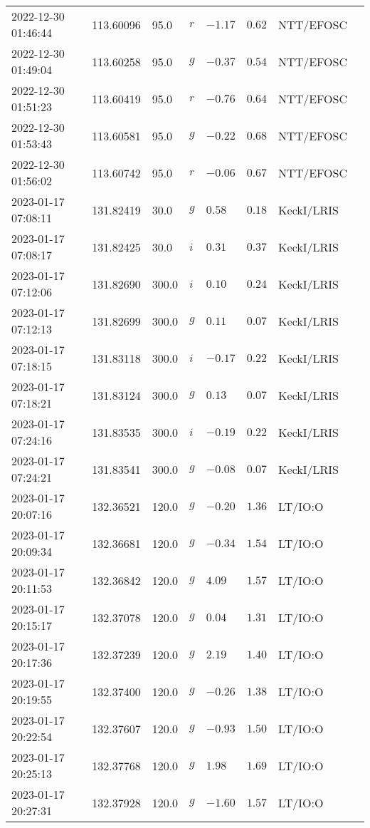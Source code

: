 \documentclass{nature_plusfigure}
\begin{document}
\begin{supplement}
\begin{center}
\begin{longtable}{llllllll}
2022-12-30 01:46:44 & 113.60096 & 95.0 & $r$ & $-1.17$ & $0.62$ & NTT/EFOSC &  \\ 
2022-12-30 01:49:04 & 113.60258 & 95.0 & $g$ & $-0.37$ & $0.54$ & NTT/EFOSC &  \\ 
2022-12-30 01:51:23 & 113.60419 & 95.0 & $r$ & $-0.76$ & $0.64$ & NTT/EFOSC &  \\ 
2022-12-30 01:53:43 & 113.60581 & 95.0 & $g$ & $-0.22$ & $0.68$ & NTT/EFOSC &  \\ 
2022-12-30 01:56:02 & 113.60742 & 95.0 & $r$ & $-0.06$ & $0.67$ & NTT/EFOSC &  \\ 
2023-01-17 07:08:11 & 131.82419 & 30.0 & $g$ & $0.58$ & $0.18$ & KeckI/LRIS &  \\ 
2023-01-17 07:08:17 & 131.82425 & 30.0 & $i$ & $0.31$ & $0.37$ & KeckI/LRIS &  \\ 
2023-01-17 07:12:06 & 131.82690 & 300.0 & $i$ & $0.10$ & $0.24$ & KeckI/LRIS &  \\ 
2023-01-17 07:12:13 & 131.82699 & 300.0 & $g$ & $0.11$ & $0.07$ & KeckI/LRIS &  \\ 
2023-01-17 07:18:15 & 131.83118 & 300.0 & $i$ & $-0.17$ & $0.22$ & KeckI/LRIS &  \\ 
2023-01-17 07:18:21 & 131.83124 & 300.0 & $g$ & $0.13$ & $0.07$ & KeckI/LRIS &  \\ 
2023-01-17 07:24:16 & 131.83535 & 300.0 & $i$ & $-0.19$ & $0.22$ & KeckI/LRIS &  \\ 
2023-01-17 07:24:21 & 131.83541 & 300.0 & $g$ & $-0.08$ & $0.07$ & KeckI/LRIS &  \\ 
2023-01-17 20:07:16 & 132.36521 & 120.0 & $g$ & $-0.20$ & $1.36$ & LT/IO:O &  \\ 
2023-01-17 20:09:34 & 132.36681 & 120.0 & $g$ & $-0.34$ & $1.54$ & LT/IO:O &  \\ 
2023-01-17 20:11:53 & 132.36842 & 120.0 & $g$ & $4.09$ & $1.57$ & LT/IO:O &  \\ 
2023-01-17 20:15:17 & 132.37078 & 120.0 & $g$ & $0.04$ & $1.31$ & LT/IO:O &  \\ 
2023-01-17 20:17:36 & 132.37239 & 120.0 & $g$ & $2.19$ & $1.40$ & LT/IO:O &  \\ 
2023-01-17 20:19:55 & 132.37400 & 120.0 & $g$ & $-0.26$ & $1.38$ & LT/IO:O &  \\ 
2023-01-17 20:22:54 & 132.37607 & 120.0 & $g$ & $-0.93$ & $1.50$ & LT/IO:O &  \\ 
2023-01-17 20:25:13 & 132.37768 & 120.0 & $g$ & $1.98$ & $1.69$ & LT/IO:O &  \\ 
2023-01-17 20:27:31 & 132.37928 & 120.0 & $g$ & $-1.60$ & $1.57$ & LT/IO:O &  \\ 

\end{longtable}
\end{center}
\end{supplement}
\end{document}
